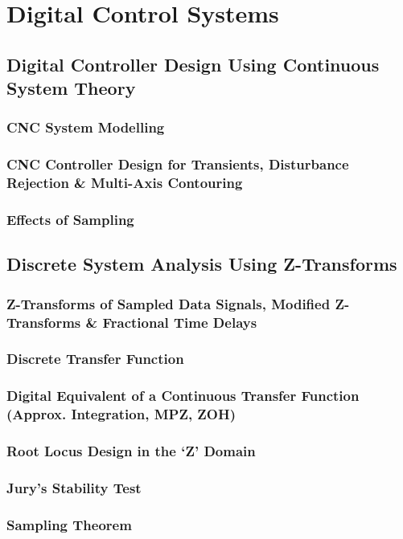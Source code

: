 \chapter{Digital Control Systems}


\newpage
\section{Digital Controller Design Using Continuous System Theory}
\subsection{CNC System Modelling}
\subsection{CNC Controller Design for Transients, Disturbance Rejection \& Multi-Axis Contouring}
\subsection{Effects of Sampling}

\newpage
\section{Discrete System Analysis Using Z-Transforms}
\subsection{Z-Transforms of Sampled Data Signals, Modified Z-Transforms \& Fractional Time Delays}
\subsection{Discrete Transfer Function}
\subsection{Digital Equivalent of a Continuous Transfer Function (Approx. Integration, MPZ, ZOH)}
\subsection{Root Locus Design in the ‘Z’ Domain}
\subsection{Jury’s Stability Test}
\subsection{Sampling Theorem}

